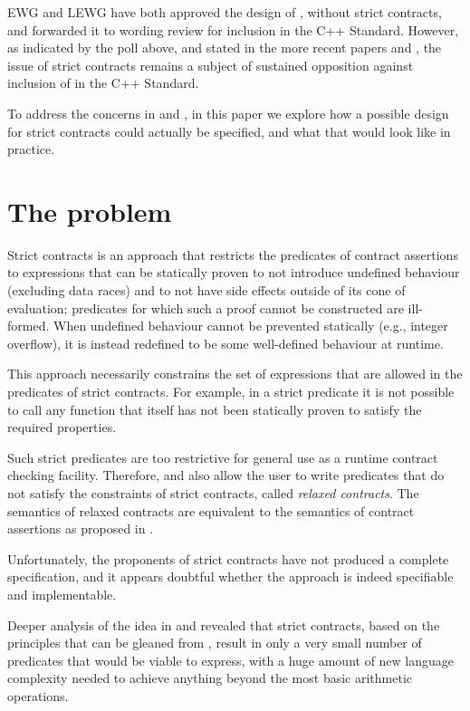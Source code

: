 EWG and LEWG have both approved the design of \cite{P2900R13}, without strict contracts, and forwarded it to wording review for inclusion in the C++ Standard. However, as indicated by the poll above, and stated in the more recent papers \cite{P3506R0} and \cite{P3573R0}, the issue of strict contracts remains a subject of sustained opposition against inclusion of \cite{P2900R13} in the C++ Standard.

To address the concerns in \cite{P3506R0} and \cite{P3573R0}, in this paper we explore how a possible design for strict contracts could actually be specified, and what that would look like in practice.

\section{The problem}

Strict contracts is an approach that restricts the predicates of contract assertions to expressions that can be statically proven to not introduce undefined behaviour (excluding data races) and to not have side effects outside of its cone of evaluation; predicates for which such a proof cannot be constructed are ill-formed. When undefined behaviour cannot be prevented statically (e.g., integer overflow), it is instead redefined to be some well-defined behaviour at runtime.

This approach necessarily  constrains the set of expressions that are allowed in the predicates of strict contracts. For example, in a strict predicate it is not possible to call any function that itself has not been statically proven to satisfy the required properties.

Such strict predicates are too restrictive for general use as a runtime contract checking facility. Therefore, \cite{P2680R1} and \cite{P3285R0} also allow the user to write predicates that do not satisfy the constraints of strict contracts, called \emph{relaxed contracts}. The semantics of relaxed contracts are equivalent to the semantics of contract assertions as proposed in \cite{P2900R13}.

Unfortunately, the proponents of strict contracts have not produced a complete specification, and it appears doubtful whether the approach is indeed specifiable and implementable.

Deeper analysis of the idea in \cite{P3376R0} and \cite{P3386R0} revealed that strict contracts, based on the principles that can be gleaned from \cite{P3285R0}, result in only a very small number of predicates that would be viable to express, with a huge amount of new language complexity needed to achieve anything beyond the most basic arithmetic operations.

